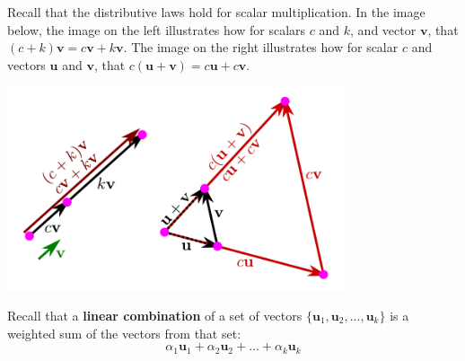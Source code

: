 \documentclass{article}
\begin{document}
Recall that the distributive laws hold for scalar multiplication. In the image below, the image on the left illustrates how for scalars \(c\) and \(k\), and vector \(\mathbf{v}\), that \((c + k)\mathbf{v} = c\mathbf{v} + k\mathbf{v}\). The image on the right illustrates how for scalar \(c\) and vectors \(\mathbf{u}\) and \(\mathbf{v}\), that \(c(\mathbf{u} + \mathbf{v}) = c\mathbf{u} + c\mathbf{v}\).

\begin{center}
\includegraphics[width = 0.75\textwidth]{distributive_laws}   
\end{center}


Recall that a {\bf linear combination} of a set of vectors \(\{\mathbf{u}_1, \mathbf{u}_2, ..., \mathbf{u}_k\}\) is a weighted sum of the vectors from that set:
\[\alpha_1 \mathbf{u}_1 + \alpha_2 \mathbf{u}_2 + ... + \alpha_k \mathbf{u}_k\]
\end{document}
